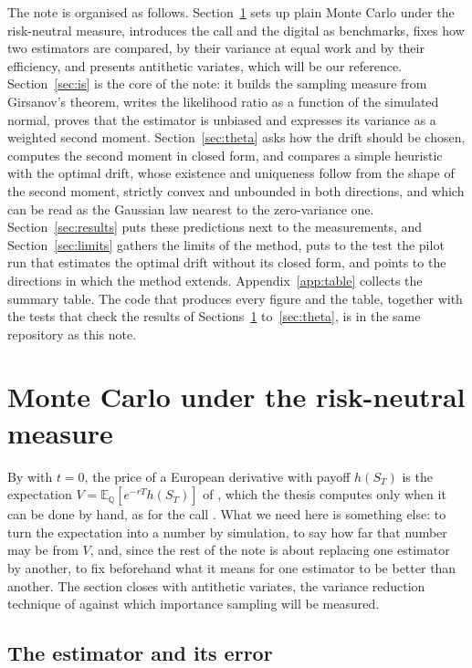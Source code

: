 \documentclass[11pt,a4paper]{article}
\theoremstyle{plain}
\theoremstyle{definition}
\theoremstyle{remark}
\newcommand{\E}{\mathbb{E}}
\newcommand{\Q}{\mathbb{Q}}
\newcommand{\1}{\mathbf{1}}
\begin{document}
The note is organised as follows. Section~\ref{sec:mc} sets up plain Monte Carlo under the risk-neutral measure, introduces the call and the digital as benchmarks, fixes how two estimators are compared, by their variance at equal work and by their efficiency, and presents antithetic variates, which will be our reference. Section~\ref{sec:is} is the core of the note: it builds the sampling measure from Girsanov's theorem, writes the likelihood ratio as a function of the simulated normal, proves that the estimator is unbiased and expresses its variance as a weighted second moment. Section~\ref{sec:theta} asks how the drift should be chosen, computes the second moment in closed form, and compares a simple heuristic with the optimal drift, whose existence and uniqueness follow from the shape of the second moment, strictly convex and unbounded in both directions, and which can be read as the Gaussian law nearest to the zero-variance one. Section~\ref{sec:results} puts these predictions next to the measurements, and Section~\ref{sec:limits} gathers the limits of the method, puts to the test the pilot run that estimates the optimal drift without its closed form, and points to the directions in which the method extends. Appendix~\ref{app:table} collects the summary table. The code that produces every figure and the table, together with the tests that check the results of Sections~\ref{sec:mc} to~\ref{sec:theta}, is in the same repository as this note.

\section{Monte Carlo under the risk-neutral measure}
\label{sec:mc}

By \cite[Thm~5.7]{tfg} with $t = 0$, the price of a European derivative with payoff $h(S_T)$ is the expectation $V = \E_\Q[e^{-rT}h(S_T)]$ of \cite[(5.23)]{tfg}, which the thesis computes only when it can be done by hand, as for the call \cite[Thm~5.8]{tfg}. What we need here is something else: to turn the expectation into a number by simulation, to say how far that number may be from $V$, and, since the rest of the note is about replacing one estimator by another, to fix beforehand what it means for one estimator to be better than another. The section closes with antithetic variates, the variance reduction technique of \cite{portfolio} against which importance sampling will be measured.

\subsection{The estimator and its error}
\end{document}
